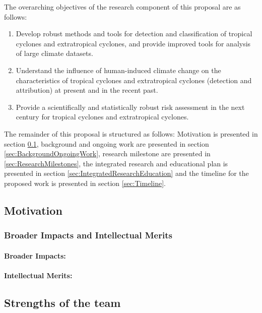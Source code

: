 \documentclass[11pt]{article}
\begin{document}
The overarching objectives of the research component of this proposal are as follows:

\begin{enumerate}
\item Develop robust methods and tools for detection and classification of tropical cyclones and extratropical cyclones, and provide improved tools for analysis of large climate datasets.

\item Understand the influence of human-induced climate change on the characteristics of tropical cyclones and extratropical cyclones (detection and attribution) at present and in the recent past.

\item Provide a scientifically and statistically robust risk assessment in the next century for tropical cyclones and extratropical cyclones.
\end{enumerate}

The remainder of this proposal is structured as follows: Motivation is presented in section \ref{sec:Motivation}, background and ongoing work are presented in section \ref{sec:BackgroundOngoingWork}, research milestone are presented in \ref{sec:ResearchMilestones}, the integrated research and educational plan is presented in section \ref{sec:IntegratedResearchEducation} and the timeline for the proposed work is presented in section \ref{sec:Timeline}.

\subsection{Motivation} \label{sec:Motivation}

\subsubsection{Broader Impacts and Intellectual Merits}

\paragraph{Broader Impacts:}  

\paragraph{Intellectual Merits:}  

\subsection{Strengths of the team}
\end{document}
